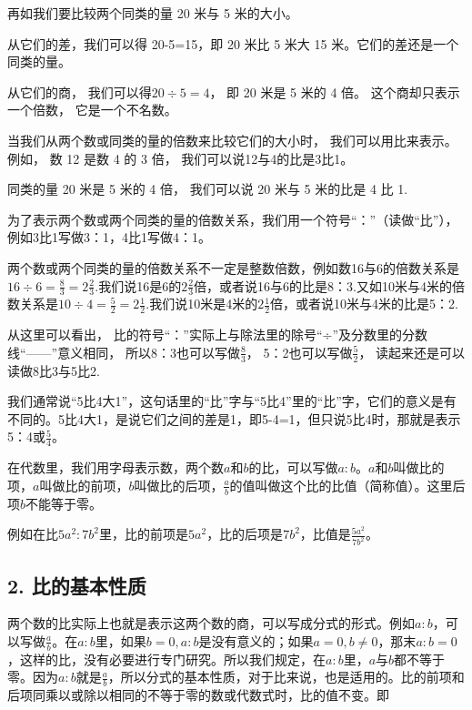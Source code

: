 再如我们要比较两个同类的量 20 米与 5 米的大小。

从它们的差，我们可以得 20-5=15，即 20 米比 5 米大 15
米。它们的差还是一个同类的量。

从它们的商， 我们可以得\(20 \div 5 = 4\)， 即 20 米是 5 米的 4 倍。
这个商却只表示一个倍数， 它是一个不名数。

当我们从两个数或同类的量的倍数来比较它们的大小时，
我们可以用比来表示。例如， 数 12 是数 4 的 3 倍，
我们可以说12与4的比是3比1。

同类的量 20 米是 5 米的 4 倍， 我们可以说 20 米与 5 米的比是 4 比 1.

为了表示两个数或两个同类的量的倍数关系，我们用一个符号``：''（读做``比''），例如3比1写做3：1，4比1写做4：1。

两个数或两个同类的量的倍数关系不一定是整数倍数，例如数16与6的倍数关系是\(16\div6=\frac{8}{3}=2\frac{2}{3}\).我们说16是6的\(2\frac{2}{3}\)倍，或者说16与6的比是8：3.又如10米与4米的倍数关系是\(10\div4=\frac{5}{2}=2\frac{1}{2}\).我们说10米是4米的\(2\frac{1}{2}\)倍，或者说10米与4米的比是5：2.

从这里可以看出，
比的符号``：''实际上与除法里的除号``÷''及分数里的分数线``------''意义相同，
所以8：3也可以写做\(\frac{8}{3}\)， 5：2也可以写做\(\frac{5}{2}\)，
读起来还是可以读做8比3与5比2.


我们通常说``5比4大1''，这句话里的``比''字与``5比4''里的``比''字，它们的意义是有不同的。5比4大1，是说它们之间的差是1，即5-4=1，但只说5比4时，那就是表示5：4或\(\frac{5}{4}\)。

在代数里，我们用字母表示数，两个数\(a\)和\(b\)的比，可以写做\(a: b\)。\(a\)和\(b\)叫做比的项，\(a\)叫做比的前项，\(b\)叫做比的后项，\(\frac{a}{b}\)的值叫做这个比的比值（简称值）。这里后项\(b\)不能等于零。

例如在比\(5a^{2}:7b^{2}\)里，比的前项是\(5a^{2}\)，比的后项是\(7b^{2}\)，比值是\(\frac{5a^{2}}{7b^{2}}\)。

\subsection{2. 比的基本性质}

两个数的比实际上也就是表示这两个数的商，可以写成分式的形式。例如\(a:b\)，可以写做\(\frac{a}{b}\)。在\(a:b\)里，如果\(b=0, a:b\)是没有意义的；如果\(a=0, b \neq 0\)，那末\(a:b=0\)，这样的比，没有必要进行专门研究。所以我们规定，在\(a:b\)里，\(a\)与\(b\)都不等于零。因为\(a:b\)就是\(\frac{a}{b}\)，所以分式的基本性质，对于比来说，也是适用的。比的前项和后项同乘以或除以相同的不等于零的数或代数式时，比的值不变。即

